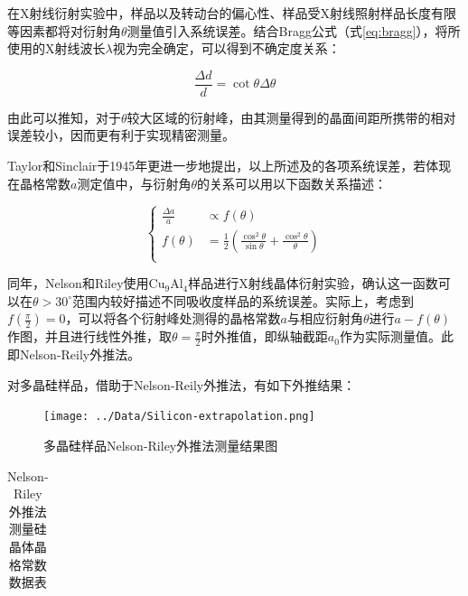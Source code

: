 \documentclass{thuemp}
\begin{document}
在X射线衍射实验中，样品以及转动台的偏心性、样品受X射线照射样品长度有限等因素都将对衍射角$\theta$测量值引入系统误差。结合Bragg公式（式\ref{eq:bragg}），将所使用的X射线波长$\lambda$视为完全确定，可以得到不确定度关系：

\begin{equation}
    \frac{\Delta d}{d} = \cot{\theta}\Delta\theta 
    \label{eqn:d_err}
\end{equation}

由此可以推知，对于$\theta$较大区域的衍射峰，由其测量得到的晶面间距所携带的相对误差较小，因而更有利于实现精密测量。

Taylor和Sinclair于1945年更进一步地提出，以上所述及的各项系统误差，若体现在晶格常数$a$测定值中，与衍射角$\theta$的关系可以用以下函数关系描述：

\begin{equation}
    \begin{cases}
        \frac{\Delta a}{a} & \propto f(\theta) \\
        f(\theta) & = \frac{1}{2} \left(\frac{\cos^2\theta}{\sin\theta} + \frac{\cos^2\theta}{\theta}\right) \\
    \end{cases}
\end{equation}

同年，Nelson和Riley使用$\text{Cu}_9\text{Al}_4$样品进行X射线晶体衍射实验，确认这一函数可以在$\theta > 30^\circ$范围内较好描述不同吸收度样品的系统误差。实际上，考虑到$f\left(\frac{\pi}{2}\right) = 0$，可以将各个衍射峰处测得的晶格常数$a$与相应衍射角$\theta$进行$a-f(\theta)$作图，并且进行线性外推，取$\theta=\frac{\pi}{2}$时外推值，即纵轴截距$a_0$作为实际测量值。此即Nelson-Reily外推法。

对多晶硅样品，借助于Nelson-Reily外推法，有如下外推结果：

\begin{figure}[H]
    \centering
    \texttt{[image: ../Data/Silicon-extrapolation.png]}
    \caption{多晶硅样品Nelson-Riley外推法测量结果图}
    \label{fig:si_xrd_extrapol}
\end{figure}

\begin{table}[H]
    \centering
    \captionnamefont{\wuhao\bf\heiti}
    \captiontitlefont{\wuhao\bf\heiti}
    \caption{Nelson-Riley外推法测量硅晶体晶格常数数据表}
    \label{tab:si_xrd_extrapol}
    \liuhao
    \begin{tabular}{ccccc}
        \toprule
        \midrule
        \bottomrule
    \end{tabular}
\end{table}
\end{document}
